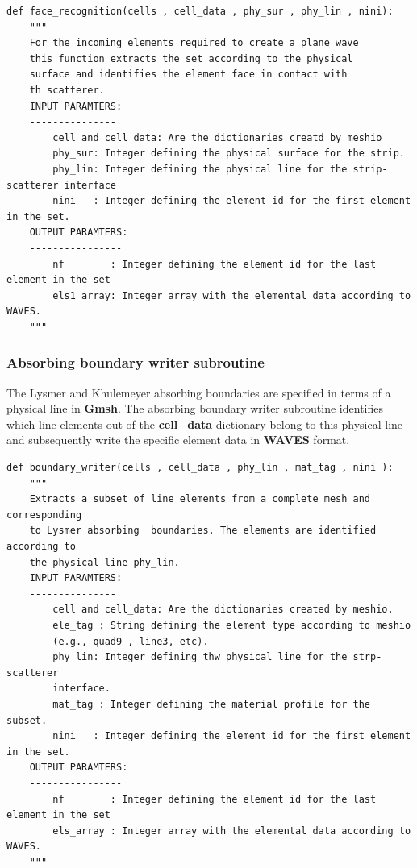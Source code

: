 \documentclass[12pt,letterpaper]{article}
\begin{document}
\begin{verbatim}
def face_recognition(cells , cell_data , phy_sur , phy_lin , nini):
    """
    For the incoming elements required to create a plane wave
    this function extracts the set according to the physical 
    surface and identifies the element face in contact with
    th scatterer.
    INPUT PARAMTERS:
    ---------------
        cell and cell_data: Are the dictionaries creatd by meshio
        phy_sur: Integer defining the physical surface for the strip.
        phy_lin: Integer defining the physical line for the strip-scatterer interface
        nini   : Integer defining the element id for the first element in the set.
    OUTPUT PARAMTERS:
    ----------------
        nf        : Integer defining the element id for the last element in the set
        els1_array: Integer array with the elemental data according to WAVES.
    """
\end{verbatim}

\subsubsection*{Absorbing boundary writer subroutine}
The Lysmer and Khulemeyer absorbing boundaries are specified in terms of a physical line in {\bf Gmsh}. The absorbing boundary writer subroutine identifies which line elements out of the {\bf cell\_data} dictionary belong to this physical line and subsequently write the specific element data in {\bf WAVES} format.

 
\begin{verbatim}
def boundary_writer(cells , cell_data , phy_lin , mat_tag , nini ):
    """
    Extracts a subset of line elements from a complete mesh and corresponding
    to Lysmer absorbing  boundaries. The elements are identified according to
    the physical line phy_lin.
    INPUT PARAMTERS:
    ---------------
        cell and cell_data: Are the dictionaries created by meshio.
        ele_tag : String defining the element type according to meshio
        (e.g., quad9 , line3, etc).
        phy_lin: Integer defining thw physical line for the strp-scatterer
        interface.
        mat_tag : Integer defining the material profile for the subset.
        nini   : Integer defining the element id for the first element in the set.
    OUTPUT PARAMTERS:
    ----------------
        nf        : Integer defining the element id for the last element in the set
        els_array : Integer array with the elemental data according to WAVES.
    """
\end{verbatim}  
  
\end{document}
